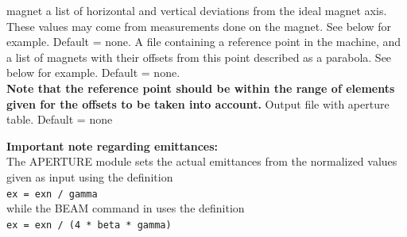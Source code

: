 \begin{madlist}
     magnet a list of horizontal and vertical deviations from the ideal
     magnet axis. These values may come from measurements done on the
     magnet. See below for example. Default = none.  
    A file containing a reference point in the machine,
     and a list of magnets with their offsets from this point described
     as a parabola. See below for example. Default = none. \\
     {\bf Note that the reference point should be within the range of
       elements given for the offsets to be taken into account.}
    Output file with aperture table. Default = none 
\end{madlist}


{\bf Important note regarding emittances:}\\
The APERTURE module sets the actual emittances from the normalized values
given as input using the definition\\
{\tt ex = exn / gamma}\\
while the BEAM command in \madx uses the definition\\
{\tt ex = exn / (4 * beta * gamma)}


